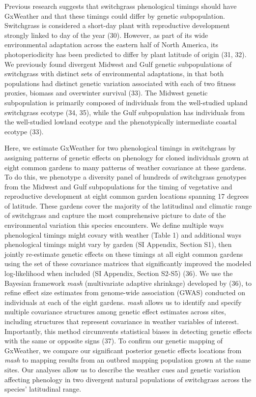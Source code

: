 \documentclass[
  9pt,
  twocolumn,
  twoside]{pnas-new}
\begin{document}
Previous research suggests that switchgrass phenological timings should
have GxWeather and that these timings could differ by genetic
subpopulation. Switchgrass is considered a short-day plant with
reproductive development strongly linked to day of the year (30).
However, as part of its wide environmental adaptation across the eastern
half of North America, its photoperiodicity has been predicted to differ
by plant latitude of origin (31, 32). We previously found divergent
Midwest and Gulf genetic subpopulations of switchgrass with distinct
sets of environmental adaptations, in that both populations had distinct
genetic variation associated with each of two fitness proxies, biomass
and overwinter survival (33). The Midwest genetic subpopulation is
primarily composed of individuals from the well-studied upland
switchgrass ecotype (34, 35), while the Gulf subpopulation has
individuals from the well-studied lowland ecotype and the phenotypically
intermediate coastal ecotype (33).

Here, we estimate GxWeather for two phenological timings in switchgrass
by assigning patterns of genetic effects on phenology for cloned
individuals grown at eight common gardens to many patterns of weather
covariance at these gardens. To do this, we phenotype a diversity panel
of hundreds of switchgrass genotypes from the Midwest and Gulf
subpopulations for the timing of vegetative and reproductive development
at eight common garden locations spanning 17 degrees of latitude. These
gardens cover the majority of the latitudinal and climatic range of
switchgrass and capture the most comprehensive picture to date of the
environmental variation this species encounters. We define multiple ways
phenological timings might covary with weather (Table 1) and additional
ways phenological timings might vary by garden (SI Appendix, Section
S1), then jointly re-estimate genetic effects on these timings at all
eight common gardens using the set of these covariance matrices that
significantly improved the modeled log-likelihood when included (SI
Appendix, Section S2-S5) (36). We use the Bayesian framework \emph{mash}
(multivariate adaptive shrinkage) developed by (36), to refine effect
size estimates from genome-wide association (GWAS) conducted on
individuals at each of the eight gardens. \emph{mash} allows us to
identify and specify multiple covariance structures among genetic effect
estimates across sites, including structures that represent covariance
in weather variables of interest. Importantly, this method circumvents
statistical biases in detecting genetic effects with the same or
opposite signs (37). To confirm our genetic mapping of GxWeather, we
compare our significant posterior genetic effects locations from
\emph{mash} to mapping results from an outbred mapping population grown
at the same sites. Our analyses allow us to describe the weather cues
and genetic variation affecting phenology in two divergent natural
populations of switchgrass across the species' latitudinal range.
\end{document}
